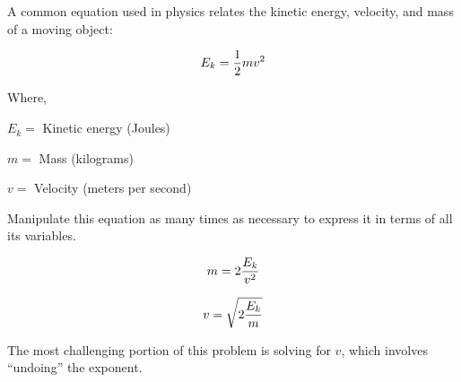 

A common equation used in physics relates the kinetic energy, velocity, and mass of a moving object:

$$E_k = {1 \over 2} m v^2$$

\noindent
Where,

$E_k =$ Kinetic energy (Joules)

$m =$ Mass (kilograms)

$v =$ Velocity (meters per second)

\vskip 10pt

Manipulate this equation as many times as necessary to express it in terms of all its variables.







$$m = 2 {E_k \over v^2}$$

\vskip 20pt

$$v = \sqrt {2 {E_k \over m}}$$







The most challenging portion of this problem is solving for $v$, which involves ``undoing'' the exponent.




